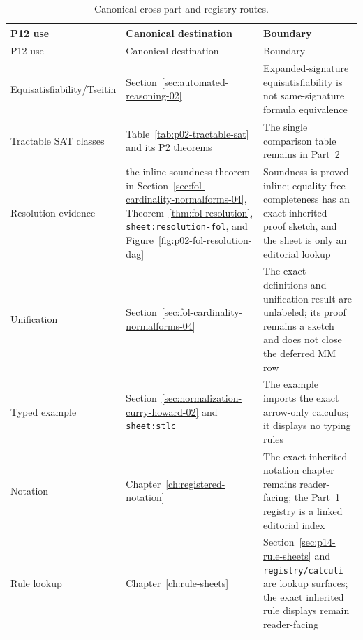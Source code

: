 \begin{longtable}{@{}p{}p{}p{}@{}}
\caption{Canonical cross-part and registry routes.}
\label{tab:p12-canonical-routes}\\
\toprule
P12 use & Canonical destination & Boundary \\ \midrule
\endfirsthead
\toprule
P12 use & Canonical destination & Boundary \\ \midrule
\endhead
Equisatisfiability/\allowbreak Tseitin &
Section~\ref{sec:automated-reasoning-02} & Expanded-signature equisatisfiability is not
same-signature formula equivalence \\ \addlinespace
Tractable SAT classes & Table~\ref{tab:p02-tractable-sat} and its P2
theorems & The single comparison table remains in Part~2 \\ \addlinespace
Resolution evidence &
the inline soundness theorem in Section~\ref{sec:fol-cardinality-normalforms-04},
Theorem~\ref{thm:fol-resolution},
\hyperref[sheet:resolution-fol]{\texttt{sheet:resolution-fol}}, and
Figure~\ref{fig:p02-fol-resolution-dag} & Soundness is proved inline;
equality-free completeness has an exact inherited proof sketch, and the sheet
is only an editorial lookup \\ \addlinespace
Unification & Section~\ref{sec:fol-cardinality-normalforms-04} & The exact
definitions and unification result are unlabeled; its proof remains a sketch
and does not close the deferred MM row \\ \addlinespace
Typed example & Section~\ref{sec:normalization-curry-howard-02} and
\hyperref[sheet:stlc]{\texttt{sheet:stlc}} & The example imports the exact
arrow-only calculus; it displays no typing rules \\ \addlinespace
Notation & Chapter~\ref{ch:registered-notation} & The exact inherited notation
chapter remains reader-facing; the Part~1 registry is a linked editorial index \\
\addlinespace
Rule lookup & Chapter~\ref{ch:rule-sheets} & Section~\ref{sec:p14-rule-sheets}
and \texttt{registry/calculi} are lookup surfaces; the exact inherited rule
displays remain reader-facing \\
\bottomrule
\end{longtable}
